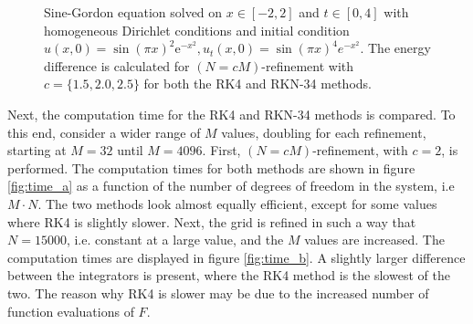 \begin{figure}[!t]
  \centering
  \hfill
  \hfill
  \caption{Sine-Gordon equation solved on $x \in [-2,2]$ and $t \in [0,4]$ with homogeneous Dirichlet conditions and initial condition $u(x,0)=\sin(\pi x)^2 \mathrm{e}^{-x^2}, u_t(x,0) = \sin{(\pi x)^4e^{-x^2}}$. The energy difference is calculated for $(N=cM)$-refinement with $c=\{1.5,2.0,2.5\}$ for both the RK4 and RKN-34 methods.}
  \label{fig:part2f_Eref}
\end{figure}

Next, the computation time for the RK4 and RKN-34 methods is compared. To this end, consider a wider range of $M$ values, doubling for each refinement, starting at $M=32$ until $M=4096$. First, $(N=cM)$-refinement, with $c=2$, is performed. The computation times for both methods are shown in figure \ref{fig:time_a} as a function of the number of degrees of freedom in the system, i.e $M \cdot N$. The two methods look almost equally efficient, except for some values where RK4 is slightly slower. Next, the grid is refined in such a way that $N=15000$, i.e. constant at a large value, and the $M$ values are increased. The computation times are displayed in figure \ref{fig:time_b}. A slightly larger difference between the integrators is present, where the RK4 method is the slowest of the two. The reason why RK4 is slower may be due to the increased number of function evaluations of $F$.

